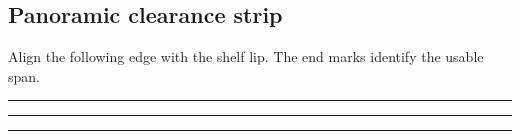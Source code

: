 \documentclass{article}
\begin{document}
\begin{landscape}\section*{Panoramic clearance strip}
Align the following edge with the shelf lip. The end marks identify the usable span.
\par\bigskip\noindent\rule{1pt}{9mm}\rule{.85\linewidth}{1pt}\rule{1pt}{9mm}
\end{landscape}
\end{document}
